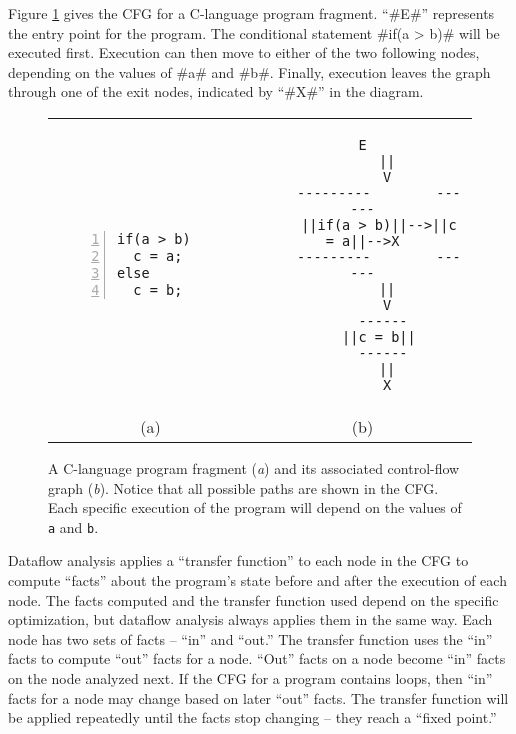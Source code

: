 \documentclass[12pt]{report}
\begin{document}
Figure \ref{fig_back1} gives the CFG for a C-language program
fragment.  ``#E#'' represents the entry point for the program. The
conditional statement #if(a > b)# will be executed first. Execution
can then move to either of the two following nodes, depending on the
values of #a# and #b#. Finally, execution leaves the graph through one of
the exit nodes, indicated by ``#X#'' in the diagram.

\begin{figure}[th]
\centering
\figbegin

\begin{tabular}{cc}
\begin{minipage}[t]{1in}
\begin{Verbatim}[numbers=left]
if(a > b)
  c = a; 
else     
  c = b; 
\end{Verbatim}
\end{minipage} \vline & 
\begin{minipage}[t]{1in}
  \begin{Verbatim}[gobble=2]
      E
      ||
      V
    ---------        ------
    ||if(a > b)||-->||c = a||-->X
    ---------        ------
      ||
      V
     ------
    ||c = b||
     ------
      ||
      X
  \end{Verbatim}
\end{minipage} \\
 (a) & (b) \rule{0pt}{24pt}
\end{tabular}
\caption{A C-language program fragment (\emph{a}) and its associated
  control-flow graph (\emph{b}). Notice that all possible paths are
  shown in the CFG. Each specific execution of the program will
  depend on the values of \verb=a= and \verb=b=.}
\label{fig_back1}
\figend
\end{figure}

Dataflow analysis applies a ``transfer function'' to each node in the
CFG to compute ``facts'' about the program's state before and after
the execution of each node. The facts computed and the transfer
function used depend on the specific optimization, but dataflow
analysis always applies them in the same way. Each node has two sets
of facts -- ``in'' and ``out.'' The transfer function uses the ``in''
facts to compute ``out'' facts for a node. ``Out'' facts on a node
become ``in'' facts on the node analyzed next.  If the CFG for a
program contains loops, then ``in'' facts for a node may change based
on later ``out'' facts. The transfer function will be applied
repeatedly until the facts stop changing -- they reach a ``fixed
point.''
\end{document}
